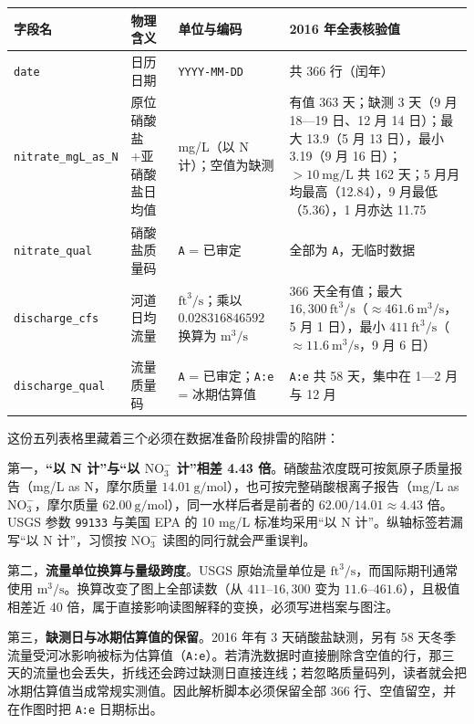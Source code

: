 \begin{center}\footnotesize
\setlength{\tabcolsep}{3pt}
\renewcommand{\arraystretch}{1.15}
\begin{tabularx}{\linewidth}{@{}l>{\raggedright\arraybackslash}p{26mm}>{\raggedright\arraybackslash}p{28mm}Y@{}}
\toprule
\textbf{字段名} & \textbf{物理含义} & \textbf{单位与编码} & \textbf{2016 年全表核验值} \\
\midrule
\texttt{date} & 日历日期 & \texttt{YYYY-MM-DD} & 共 366 行（闰年） \\
\texttt{nitrate\_mgL\_as\_N} & 原位硝酸盐+亚硝酸盐日均值 & mg/L（以 N 计）；空值为缺测 & 有值 363 天；缺测 3 天（9 月 18—19 日、12 月 14 日）；最大 13.9（5 月 13 日），最小 3.19（9 月 16 日）；$>10\ \text{mg/L}$ 共 162 天；5 月月均最高（12.84），9 月最低（5.36），1 月亦达 11.75 \\
\texttt{nitrate\_qual} & 硝酸盐质量码 & \texttt{A} = 已审定 & 全部为 \texttt{A}，无临时数据 \\
\texttt{discharge\_cfs} & 河道日均流量 & $\text{ft}^3/\text{s}$；乘以 $0.028316846592$ 换算为 $\text{m}^3/\text{s}$ & 366 天全有值；最大 $16,300\ \text{ft}^3/\text{s}$（$\approx 461.6\ \text{m}^3/\text{s}$，5 月 1 日），最小 $411\ \text{ft}^3/\text{s}$（$\approx 11.6\ \text{m}^3/\text{s}$，9 月 6 日） \\
\texttt{discharge\_qual} & 流量质量码 & \texttt{A} = 已审定；\texttt{A:e} = 冰期估算值 & \texttt{A:e} 共 58 天，集中在 1—2 月与 12 月 \\
\bottomrule
\end{tabularx}
\end{center}

这份五列表格里藏着三个必须在数据准备阶段排雷的陷阱：

第一，\textbf{“以 N 计”与“以 $\text{NO}_3^-$ 计”相差 4.43 倍}。硝酸盐浓度既可按氮原子质量报告（mg/L as N，摩尔质量 $14.01\ \text{g/mol}$），也可按完整硝酸根离子报告（mg/L as $\text{NO}_3^-$，摩尔质量 $62.00\ \text{g/mol}$），同一水样后者是前者的 $62.00 / 14.01 \approx 4.43$ 倍。USGS 参数 \texttt{99133} 与美国 EPA 的 10 mg/L 标准均采用“以 N 计”。纵轴标签若漏写“以 N 计”，习惯按 $\text{NO}_3^-$ 读图的同行就会严重误判。

第二，\textbf{流量单位换算与量级跨度}。USGS 原始流量单位是 $\text{ft}^3/\text{s}$，而国际期刊通常使用 $\text{m}^3/\text{s}$。换算改变了图上全部读数（从 $411\text{--}16,300$ 变为 $11.6\text{--}461.6$），且极值相差近 40 倍，属于直接影响读图解释的变换，必须写进档案与图注。

第三，\textbf{缺测日与冰期估算值的保留}。2016 年有 3 天硝酸盐缺测，另有 58 天冬季流量受河冰影响被标为估算值（\texttt{A:e}）。若清洗数据时直接删除含空值的行，那三天的流量也会丢失，折线还会跨过缺测日直接连线；若忽略质量码列，读者就会把冰期估算值当成常规实测值。因此解析脚本必须保留全部 366 行、空值留空，并在作图时把 \texttt{A:e} 日期标出。


